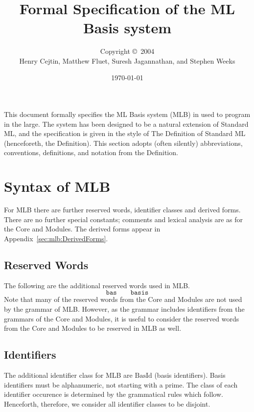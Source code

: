 \documentclass[draft]{article}
\newcommand{\mrm}[1]{\mathrm{#1}}
\newcommand{\mtt}[1]{\mathtt{#1}}
\begin{document}
\title{Formal Specification of the ML Basis system}
\author{Copyright \copyright\ 2004\\
        Henry Cejtin, Matthew Fluet, Suresh Jagannathan, and Stephen Weeks}
\date{\today}
\maketitle
%
This document formally specifies the ML Basis system (MLB) in {\mlton}
used to program in the large.  The system has been designed to be a
natural extension of Standard ML, and the specification is given in
the style of The Definition of Standard ML~\cite{MTHM97} (henceforeth,
the Definition).  This section adopts (often silently) abbreviations,
conventions, definitions, and notation from the Definition.
%
\section{Syntax of MLB}
For MLB there are further reserved words, identifier classes and
derived forms.  There are no further special constants; comments and
lexical analysis are as for the Core and Modules.  The derived forms
appear in Appendix~\ref{sec:mlb:DerivedForms}.
%
\subsection{Reserved Words}
The following are the additional reserved words used in MLB.
\begin{displaymath}
\mtt{bas} \quad\quad \mtt{basis}
\end{displaymath}
Note that many of the reserved words from the Core and Modules are not
used by the grammar of MLB.  However, as the grammar includes
identifiers from the grammars of the Core and Modules, it is useful to
consider the reserved words from the Core and Modules to be reserved
in MLB as well.
%
\subsection{Identifiers}
The additional identifier class for MLB are $\mrm{BasId}$ (basis
identifiers).  Basis identifiers must be alphanumeric, not starting
with a prime.  The class of each identifier occurence is determined by
the grammatical rules which follow.  Henceforth, therefore, we
consider all identifier classes to be disjoint.
%
\end{document}
